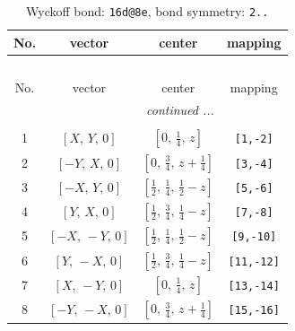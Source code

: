 \documentclass[fleqn,8pt]{jsarticle}
\begin{document}
\begin{longtable}{cccc}
\caption{Wyckoff bond: {\tt 16d@8e}, bond symmetry: {\tt 2..}}
 \\
 \hline \hline
No. & vector & center & mapping \\ \hline \endfirsthead

\multicolumn{3}{l}{\tablename\ \thetable{}} \\
 \hline \hline
No. & vector & center & mapping \\ \hline \endhead

 \hline \hline
\multicolumn{3}{r}{\footnotesize\it continued ...} \\ \endfoot

 \hline \hline
\multicolumn{3}{r}{} \\ \endlastfoot

1 & $\left[ X,\, Y,\, 0 \right]$ & $\left[ 0,\, \frac{1}{4},\, z \right]$ & {\tt [1,-2]} \\ \hline
2 & $\left[ - Y,\, X,\, 0 \right]$ & $\left[ 0,\, \frac{3}{4},\, z + \frac{1}{4} \right]$ & {\tt [3,-4]} \\ \hline
3 & $\left[ - X,\, Y,\, 0 \right]$ & $\left[ \frac{1}{2},\, \frac{1}{4},\, \frac{1}{2} - z \right]$ & {\tt [5,-6]} \\ \hline
4 & $\left[ Y,\, X,\, 0 \right]$ & $\left[ \frac{1}{2},\, \frac{3}{4},\, \frac{1}{4} - z \right]$ & {\tt [7,-8]} \\ \hline
5 & $\left[ - X,\, - Y,\, 0 \right]$ & $\left[ \frac{1}{2},\, \frac{1}{4},\, \frac{1}{2} - z \right]$ & {\tt [9,-10]} \\ \hline
6 & $\left[ Y,\, - X,\, 0 \right]$ & $\left[ \frac{1}{2},\, \frac{3}{4},\, \frac{1}{4} - z \right]$ & {\tt [11,-12]} \\ \hline
7 & $\left[ X,\, - Y,\, 0 \right]$ & $\left[ 0,\, \frac{1}{4},\, z \right]$ & {\tt [13,-14]} \\ \hline
8 & $\left[ - Y,\, - X,\, 0 \right]$ & $\left[ 0,\, \frac{3}{4},\, z + \frac{1}{4} \right]$ & {\tt [15,-16]} \\
\end{longtable}
\renewcommand{\arraystretch}{1.2}
\end{document}
